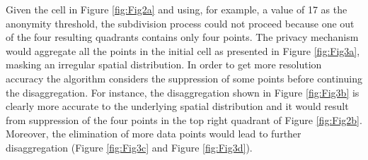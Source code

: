 Given the cell in Figure \ref{fig:Fig2a} and using, for example, a value of 17 as the anonymity threshold, the subdivision process could not proceed because one out of the four resulting quadrants contains only four points. The privacy mechanism would aggregate all the points in the initial cell as presented in Figure \ref{fig:Fig3a}, masking an irregular spatial distribution. In order to get more resolution accuracy the  algorithm considers the suppression of some points before continuing the disaggregation. For instance, the disaggregation shown in Figure \ref{fig:Fig3b} is clearly more accurate to the underlying spatial distribution and it would result from suppression of the four points in the top right quadrant of Figure \ref{fig:Fig2b}. Moreover, the elimination of more data points would lead to further disaggregation (Figure \ref{fig:Fig3c} and Figure \ref{fig:Fig3d}).
